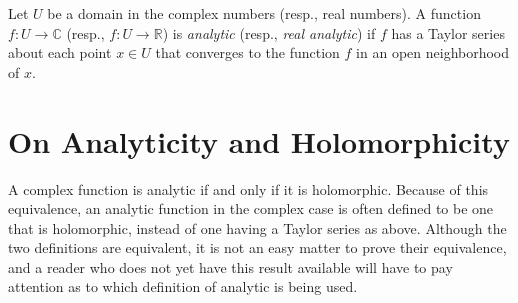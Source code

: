 \documentclass{article}
\begin{document}
Let $U$ be a domain in the complex numbers (resp., real numbers). A function $f: U \longrightarrow \mathbb{C}$ (resp., $f: U \longrightarrow \mathbb{R}$) is {\em analytic} (resp., {\em real analytic}) if $f$ has a Taylor series about each point $x \in U$ that converges to the function $f$ in an open neighborhood of $x$.

\section{On Analyticity and Holomorphicity}

A complex function is analytic if and only if it is holomorphic. Because of this equivalence, an analytic function in the complex case is often defined to be one that is holomorphic, instead of one having a Taylor series as above. Although the two definitions are equivalent, it is not an easy matter to prove their equivalence, and a reader who does not yet have this result available will have to pay attention as to which definition of analytic is being used.
\end{document}
